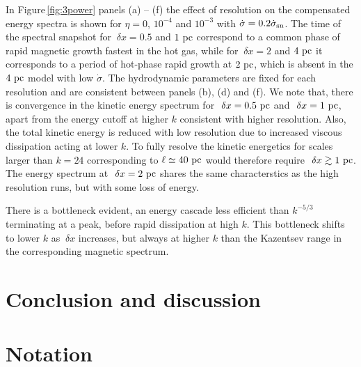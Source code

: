 \documentclass[preprint2]{aastex63}
\newcommand\SNr{\dot\sigma_{\rm sn}}
\newcommand\pc{~ {\rm pc}}
\newcommand\dx{~ {\delta x}}
\begin{document}
In Figure\,\ref{fig:3power} panels (a) -- (f) the effect of resolution on the
compensated energy spectra is shown for $\eta=0$, $10^{-4}$ and $10^{-3}$
with $\dot\sigma=0.2\SNr$.
The time of the spectral snapshot for $\dx=0.5$ and $1\pc$ correspond to a
common phase of rapid magnetic growth fastest in the hot gas, while for
$\dx=2$ and $4\pc$ it corresponds to a period of hot-phase rapid growth at
$2\pc$, which is absent in the $4\pc$ model with low $\dot\sigma$.
The hydrodynamic parameters are fixed for each resolution and are 
consistent between panels (b), (d) and (f).
We note that, there is convergence in the kinetic energy spectrum for
$\dx=0.5\pc$ and $\dx=1\pc$, apart from the energy cutoff at higher $k$
consistent with higher resolution.
Also, the total kinetic energy is reduced with low resolution due to 
increased viscous dissipation acting at lower $k$.
To fully resolve the kinetic energetics for scales larger than $k=24$ corresponding to $\ell\simeq40\pc$ would therefore require $\dx\gtrsim1\pc$.
The energy spectrum at $\dx=2\pc$ shares the same characterstics as the high
resolution runs, but with some loss of energy.

There is a bottleneck evident, an energy cascade less efficient than $k^{-5/3}$
terminating at a peak, before rapid dissipation at high $k$.
This bottleneck shifts to lower $k$ as $\dx$ increases, but always at higher
$k$ than the Kazentsev range in the corresponding magnetic spectrum.


\section{Conclusion and discussion}\label{sec:conc}

{}


\appendix

\section{Notation}\label{sec:table}
\end{document}
